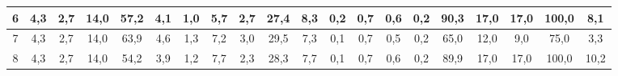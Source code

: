 \begin{sidewaystable}[]
\begin{tabular}{|c|c|c|c|c|c|c|c|c|c|c|c|c|c|c|c|c|c|c|c|}
    6  & 4,3                                              & 2,7                                              & 14,0                                             & 57,2                                             & 4,1                                              & 1,0                                              & 5,7                                              & 2,7                                              & 27,4                                             & 8,3                                              & 0,2                                              & 0,7                                              & 0,6                                              & 0,2                                              & 90,3                                            & 17,0                                            & 17,0                                            & 100,0                                           & 8,1                                             \\ \hline
    7  & 4,3                                              & 2,7                                              & 14,0                                             & 63,9                                             & 4,6                                              & 1,3                                              & 7,2                                              & 3,0                                              & 29,5                                             & 7,3                                              & 0,1                                              & 0,7                                              & 0,5                                              & 0,2                                              & 65,0                                            & 12,0                                            & 9,0                                             & 75,0                                            & 3,3                                             \\ \hline
    8  & 4,3                                              & 2,7                                              & 14,0                                             & 54,2                                             & 3,9                                              & 1,2                                              & 7,7                                              & 2,3                                              & 28,3                                             & 7,7                                              & 0,1                                              & 0,7                                              & 0,6                                              & 0,2                                              & 89,9                                            & 17,0                                            & 17,0                                            & 100,0                                           & 10,2                                            \\ \hline

\end{tabular}
\end{sidewaystable}
